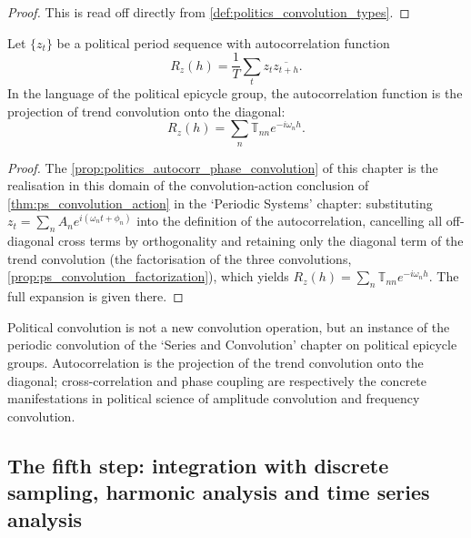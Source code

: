 \begin{proof}
This is read off directly from \cref{def:politics_convolution_types}.
\end{proof}

\begin{proposition}\label{prop:politics_autocorr_phase_convolution}
Let $\{z_t\}$ be a political period sequence with autocorrelation function
\[
R_z(h)=\frac1T\sum_t z_t\overline{z_{t+h}}.
\]
In the language of the political epicycle group, the autocorrelation function is the projection of trend convolution onto the diagonal:
\[
R_z(h)=\sum_n\mathbb T_{nn}e^{-i\omega_n h}.
\]
\end{proposition}

\begin{proof}
The \cref{prop:politics_autocorr_phase_convolution} of this chapter is the realisation in this domain of the convolution-action conclusion of \cref{thm:ps_convolution_action} in the `Periodic Systems' chapter:
substituting $z_t=\sum_n A_n e^{i(\omega_n t+\phi_n)}$ into the definition of the autocorrelation, cancelling all off-diagonal cross terms by orthogonality and retaining only the diagonal term of the trend convolution
(the factorisation of the three convolutions, \cref{prop:ps_convolution_factorization}), which yields $R_z(h)=\sum_n\mathbb T_{nn}e^{-i\omega_n h}$.
The full expansion is given there.
\end{proof}

\begin{remark}\label{rem:politics_convolution_relation}
Political convolution is not a new convolution operation, but an instance of the periodic convolution of the `Series and Convolution' chapter on political epicycle groups. Autocorrelation is the projection of the trend convolution onto the diagonal; cross-correlation and phase coupling are respectively the concrete manifestations in political science of amplitude convolution and frequency convolution.
\end{remark}

\subsection{The fifth step: integration with discrete sampling, harmonic analysis and time series analysis}

